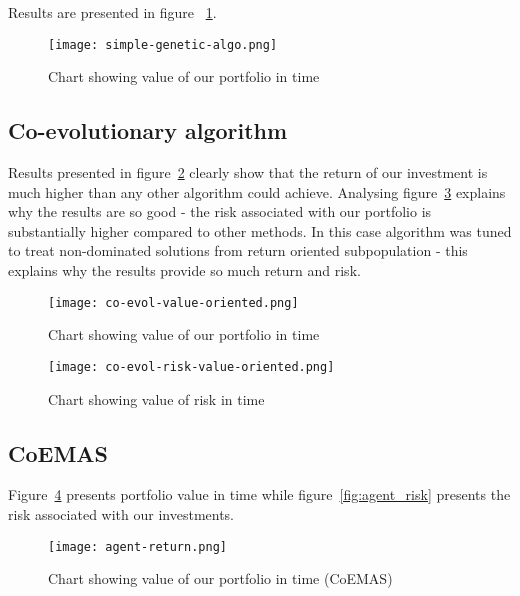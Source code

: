 Results are presented in figure ~\ref{fig:gen-algo}.

\begin{figure}[ht]
  \begin{center}
    \texttt{[image: simple-genetic-algo.png]}
  \end{center}
  \caption{Chart showing value of our portfolio in time}
  \label{fig:gen-algo}
\end{figure}

\subsection{Co-evolutionary algorithm}

Results presented in figure~\ref{fig:co_eval_return} clearly show that the return of our investment is much higher than any other algorithm could achieve.  
Analysing figure~\ref{fig:co_eval_risk} explains why the results are so good - the risk associated with our portfolio is substantially higher compared to other methods.
In this case algorithm was tuned to treat non-dominated solutions from return oriented subpopulation - this explains why the results provide so much return and risk. 

\begin{figure}[ht]
  \begin{center}
    \texttt{[image: co-evol-value-oriented.png]}
  \end{center}
  \caption{Chart showing value of our portfolio in time}
  \label{fig:co_eval_return}
\end{figure}


\begin{figure}[ht]
  \begin{center}
    \texttt{[image: co-evol-risk-value-oriented.png]}
  \end{center}
  \caption{Chart showing value of risk in time}
  \label{fig:co_eval_risk}
\end{figure}

\subsection{CoEMAS}

Figure~\ref{fig:agent_return} presents portfolio value in time while  figure~\ref{fig:agent_risk} presents the risk associated with our investments.

\begin{figure}[ht]
  \begin{center}
    \texttt{[image: agent-return.png]}
  \end{center}
  \caption{Chart showing value of our portfolio in time (CoEMAS)}
  \label{fig:agent_return}
\end{figure}


